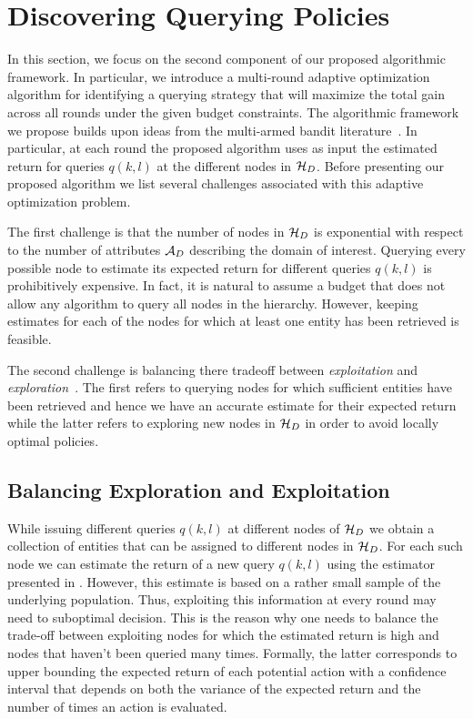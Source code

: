 \section{Discovering Querying Policies}
\label{sec:solving}
In this section, we focus on the second component of our proposed algorithmic framework. In particular, we introduce a multi-round adaptive optimization algorithm for identifying a querying strategy that will maximize the total gain across all rounds under the given budget constraints. The algorithmic framework we propose builds upon ideas from the multi-armed bandit literature~\cite{Auer:2003,EvenDar06actionelimination}. In particular,  at each round the proposed algorithm uses as input the estimated return for queries $q(k,l)$ at the different nodes in $\mathcal{H}_D$. Before presenting our proposed algorithm we list several challenges associated with this adaptive optimization problem.

\squishlist
\item The first challenge is that the number of nodes in $\mathcal{H}_D$ is exponential with respect to the number of attributes $\mathcal{A}_D$ describing the domain of interest. Querying every possible node to estimate its expected return for different queries $q(k,l)$ is prohibitively expensive. In fact, it is natural to assume a budget that does not allow any algorithm to query all nodes in the hierarchy. However, keeping estimates for each of the nodes for which at least one entity has been retrieved is feasible. 
\item The second challenge is balancing there tradeoff between {\em exploitation} and {\em exploration}~\cite{Auer:2003}. The first refers to querying nodes for which sufficient entities have been retrieved and hence we have an accurate estimate for their expected return while the latter refers to exploring new nodes in $\mathcal{H}_D$ in order to avoid locally optimal policies.
\squishend

\subsection{Balancing Exploration and Exploitation}
While issuing different queries $q(k,l)$ at different nodes of $\mathcal{H}_D$ we obtain a collection of entities that can be assigned to different nodes in $\mathcal{H}_D$. For each such node we can estimate the return of a new query $q(k,l)$ using the estimator presented in . However, this estimate is based on a rather small sample of the underlying population. Thus, exploiting this information at every round may need to suboptimal decision. This is the reason why one needs to balance the trade-off between exploiting nodes for which the estimated return is high and nodes that haven't been queried many times. Formally, the latter corresponds to upper bounding the expected return of each potential action with a confidence interval that depends on both the variance of the expected return and the number of times an action is evaluated.

